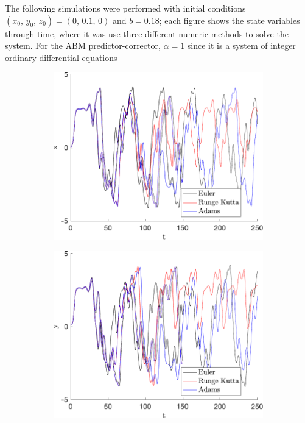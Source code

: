 The following simulations were performed with initial conditions $(x_0,\,y_0,\,z_0)=(0,\,0.1,\,0)$ and $b=0.18$; each figure shows the state variables through time, where it was use three different numeric methods to solve the system. For the ABM predictor-corrector, $\alpha=1$ since it is a system of integer ordinary differential equations
\begin{figure}[H]
\centering
\begin{subfigure}[ht]{0.3\textwidth}
\includegraphics[scale=0.33]{files/ThomasXvsT.pdf}
\end{subfigure}
\begin{subfigure}[ht]{0.3\textwidth}
\includegraphics[scale=0.33]{files/ThomasYvsT.pdf}

\end{subfigure}
\end{figure}
